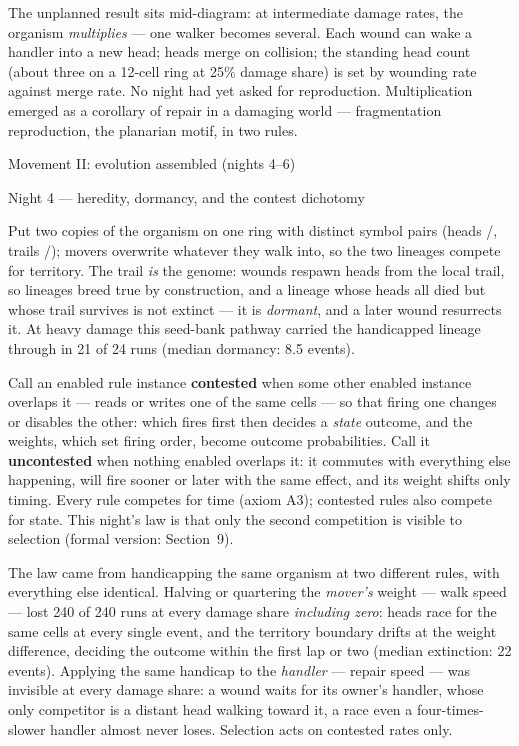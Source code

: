 The unplanned result sits mid-diagram: at intermediate damage
rates, the organism {\it multiplies} --- one walker becomes
several. Each wound can wake a handler into a new
head; heads merge on collision; the standing head count (about
three on a 12-cell ring at 25\% damage share) is set by wounding
rate against merge rate. No night had yet asked for reproduction.
Multiplication emerged as a corollary of repair in a damaging
world --- fragmentation reproduction, the planarian motif, in two
rules.

\sec Movement II: evolution assembled (nights 4--6)

\secc Night 4 --- heredity, dormancy, and the contest dichotomy

Put two copies of the organism on one ring with distinct symbol
pairs (heads /, trails /); movers overwrite
whatever they walk into, so the two lineages compete for territory.
The trail {\it is} the genome: wounds respawn heads from the local
trail, so lineages breed true by construction, and a lineage whose
heads all died but whose trail survives is not extinct --- it is
{\it dormant}, and a later wound resurrects it. At heavy damage
this seed-bank pathway carried the handicapped lineage through in
21 of 24 runs (median dormancy: 8.5 events).

Call an enabled rule instance {\bf contested} when some other
enabled instance overlaps it --- reads or writes one of the same
cells --- so that firing one changes or disables the other: which
fires first then decides a {\it state} outcome, and the weights,
which set firing order, become outcome probabilities. Call it
{\bf uncontested} when nothing enabled overlaps it: it commutes
with everything else happening, will fire sooner or later with
the same effect, and its weight shifts only timing. Every rule
competes for time (axiom A3); contested rules also compete for
state. This night's law is that only the second competition is
visible to selection (formal version: Section~9).

The law came from handicapping the same organism at two different
rules, with everything else identical. Halving or
quartering the {\it mover's} weight --- walk speed --- lost 240 of
240 runs at every damage share {\it including zero}: heads race
for the same cells at every single event, and the territory
boundary drifts at the weight difference, deciding the outcome
within the first lap or two (median extinction: 22 events).
Applying the same handicap to the {\it handler} --- repair speed
--- was invisible at every damage share: a wound waits for its
owner's handler, whose only competitor is a distant head walking
toward it, a race even a four-times-slower handler almost never
loses.  Selection acts on contested rates
only.

